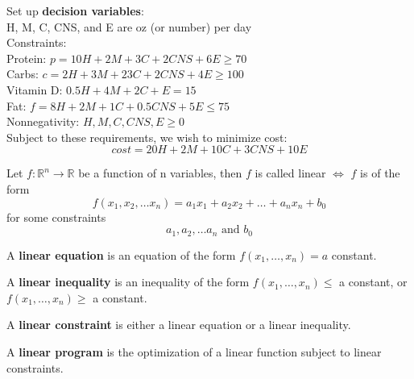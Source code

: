 \documentclass{article}
\begin{document}
\begin{answer}
Set up \textbf{decision variables}: \\
H, M, C, CNS, and E are oz (or number) per day\\

Constraints: \\
Protein: \(p=10H+2M+3C+2CNS+6E\geq70\) \\
Carbs: \( c=2H+3M+23C+2CNS+4E\geq100\) \\
Vitamin D: \(0.5H+4M+2C+E=15\) \\
Fat: \(f=8H+2M+1C+0.5CNS+5E\leq75\) \\
Nonnegativity: \(H,M,C,CNS,E\geq0\) \\

Subject to these requirements, we wish to minimize cost:
\[
    cost=20H+2M+10C+3CNS+10E
\]
\end{answer}

\begin{definition}
    Let \(f:\mathbb{R}^n\rightarrow \mathbb{R}\) be a function of n variables, then $f$ is called
    linear $\iff$ $f$ is of the form
    \[
        f(x_1,x_2, \dots x_n)=a_1x_1+a_2x_2+\dots+a_nx_n+b_0
    \]
    for some constraints
    \[
        a_1, a_2, \dots a_n \text{ and }b_0
    \]

\end{definition}

\begin{definition}
    A \textbf{linear equation} is an equation of the form \(f(x_1, \dots, x_n)=a\) constant. 
\end{definition}

\begin{definition}
    A \textbf{linear inequality} is an inequality of the form \(f(x_1, \dots, x_n)\leq\) 
    a constant, or \(f(x_1, \dots,x_n)\geq\) a constant.  
\end{definition}

\begin{definition}
    A \textbf{linear constraint} is either a linear equation or a linear inequality.
\end{definition}

\begin{definition}
    A \textbf{linear program} is the optimization of a linear function subject to linear constraints.
\end{definition}
\end{document}
